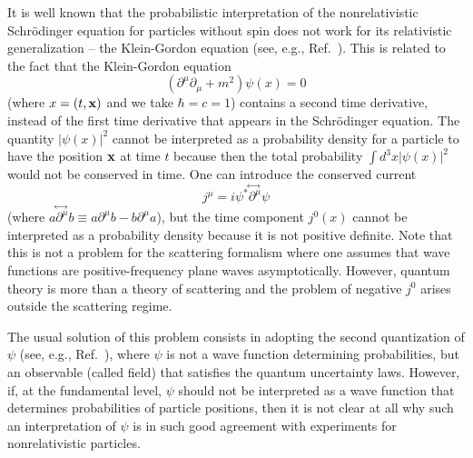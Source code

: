 \documentclass[12pt]{article}
\begin{document}
It is well known that the probabilistic interpretation 
of the nonrelativistic Schr\"odinger equation for 
particles without spin does not work for its relativistic 
generalization -- the Klein-Gordon equation
(see, e.g., Ref.~\cite{bjor1}).
This is related to the fact that the Klein-Gordon equation
\begin{equation}\label{KG}
(\partial^{\mu}\partial_{\mu}+m^2)\psi(x)=0
\end{equation}
(where $x=(t,\bf{x})$ and we take $\hbar=c=1$) 
contains a second time derivative, instead of the first time 
derivative that appears in the Schr\"odinger equation.
%
%
The quantity $|\psi(x)|^2$ cannot be interpreted as a 
probability density for a particle to have the position $\bf{x}$ 
at time $t$ because then the total probability 
$\int d^3x |\psi(x)|^2$ would not be conserved in time.
One can introduce the conserved current
\begin{equation}\label{cur}
j^{\mu}=i\psi^* \!\stackrel{\leftrightarrow\;}{\partial^{\mu}}\! \psi 
\end{equation}
(where $a \!\stackrel{\leftrightarrow\;}{\partial^{\mu}}\! b \equiv
a\partial^{\mu}b - b\partial^{\mu}a$),
but the time component $j^0(x)$ cannot be interpreted as a probability 
density because it is not positive definite.
%
Note that this is not a problem for the scattering formalism 
where one assumes that wave functions are positive-frequency 
plane waves asymptotically. However, quantum theory is more 
than a theory of scattering and the problem of negative 
$j^0$ arises outside the scattering regime.  

The usual solution of this problem consists in adopting the 
second quantization of $\psi$ (see, e.g., Ref.~\cite{bjor2}), where 
$\psi$ is not a wave function determining probabilities, but  
an observable (called field) that satisfies the quantum 
uncertainty laws. However, if, at the fundamental level,
$\psi$ should not be interpreted as a wave function 
that determines probabilities of particle positions, then 
it is not clear at all why
such an interpretation of $\psi$ is in such good 
agreement with experiments for nonrelativistic particles.
\end{document}
